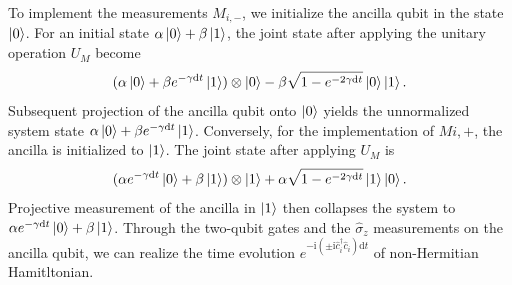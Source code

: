 \documentclass[longbibliography, aps, prx, amsmath, amssymb, amsfonts, twocolumn,superscriptaddress, footinbib]{revtex4-1}
\begin{document}
	To implement the measurements $M_{i,-}$, we initialize the ancilla qubit in the state $\ket{0}$. For an initial state $\alpha \ket{0} + \beta \ket{1}$, the joint state after applying the unitary operation $U_M$ become
	\begin{equation}
		(\alpha \ket{0} + \beta e^{-\gamma \mathrm{d}t} \ket{1}) \otimes \ket{0} - \beta \sqrt{1-e^{-2\gamma\mathrm{d}t}} \ket{0} \ket{1}.
	\end{equation}
	Subsequent projection of the ancilla qubit onto $\ket{0}$ yields the unnormalized system state $\alpha \ket{0} + \beta e^{-\gamma \mathrm{d}t} \ket{1}$. 
	Conversely, for the implementation of $M{i,+}$, the ancilla is initialized to $\ket{1}$. The joint state after applying $U_M$ is
	\begin{equation}
		(\alpha e^{-\gamma \mathrm{d}t} \ket{0} + \beta  \ket{1}) \otimes \ket{1} + \alpha \sqrt{1-e^{-2\gamma\mathrm{d}t}} \ket{1} \ket{0}.
	\end{equation}
	Projective measurement of the ancilla in $\ket{1}$ then collapses the system to $\alpha e^{-\gamma \mathrm{d}t} \ket{0} + \beta  \ket{1}$.
	Through the two-qubit gates and the $\hat{\sigma}_z$ measurements on the ancilla qubit, we can realize the time evolution $e^{-\mathrm{i} (\pm \mathrm{i} \hat{c}_i^{\dagger}\hat{c}_i) \mathrm{d}t}$ of non-Hermitian Hamitltonian.

	
\end{document}
